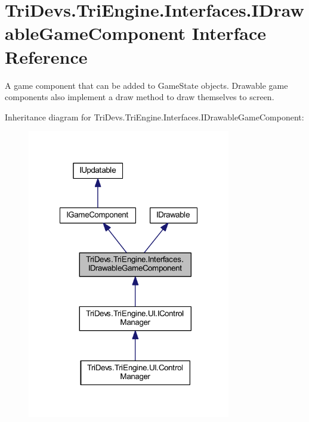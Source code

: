 \hypertarget{interface_tri_devs_1_1_tri_engine_1_1_interfaces_1_1_i_drawable_game_component}{\section{Tri\-Devs.\-Tri\-Engine.\-Interfaces.\-I\-Drawable\-Game\-Component Interface Reference}
\label{interface_tri_devs_1_1_tri_engine_1_1_interfaces_1_1_i_drawable_game_component}
}


A game component that can be added to Game\-State objects. Drawable game components also implement a draw method to draw themselves to screen.  




Inheritance diagram for Tri\-Devs.\-Tri\-Engine.\-Interfaces.\-I\-Drawable\-Game\-Component\-:
\nopagebreak
\begin{figure}[H]
\begin{center}
\leavevmode
\includegraphics[width=251pt]{interface_tri_devs_1_1_tri_engine_1_1_interfaces_1_1_i_drawable_game_component__inherit__graph}
\end{center}
\end{figure}


